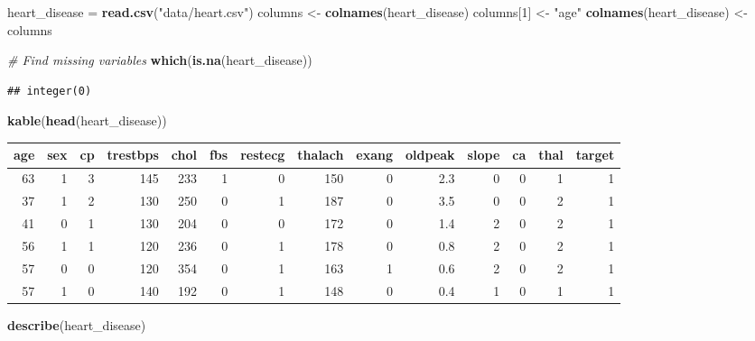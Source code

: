 \documentclass[]{article}
\newenvironment{Shaded}{\begin{snugshade}}{\end{snugshade}}
\newcommand{\KeywordTok}[1]{\textcolor[rgb]{0.13,0.29,0.53}{\textbf{#1}}}
\newcommand{\DecValTok}[1]{\textcolor[rgb]{0.00,0.00,0.81}{#1}}
\newcommand{\StringTok}[1]{\textcolor[rgb]{0.31,0.60,0.02}{#1}}
\newcommand{\CommentTok}[1]{\textcolor[rgb]{0.56,0.35,0.01}{\textit{#1}}}
\newcommand{\NormalTok}[1]{#1}
\begin{document}
\begin{Shaded}
\begin{Highlighting}[]
\NormalTok{heart_disease =}\StringTok{ }\KeywordTok{read.csv}\NormalTok{(}\StringTok{"data/heart.csv"}\NormalTok{)}
\NormalTok{columns <-}\StringTok{ }\KeywordTok{colnames}\NormalTok{(heart_disease)}
\NormalTok{columns[}\DecValTok{1}\NormalTok{] <-}\StringTok{ "age"}
\KeywordTok{colnames}\NormalTok{(heart_disease) <-}\StringTok{ }\NormalTok{columns}

\CommentTok{# Find missing variables}
\KeywordTok{which}\NormalTok{(}\KeywordTok{is.na}\NormalTok{(heart_disease))}
\end{Highlighting}
\end{Shaded}

\begin{verbatim}
## integer(0)
\end{verbatim}

\begin{Shaded}
\begin{Highlighting}[]
\KeywordTok{kable}\NormalTok{(}\KeywordTok{head}\NormalTok{(heart_disease))}
\end{Highlighting}
\end{Shaded}

\begin{longtable}[]{@{}rrrrrrrrrrrrrr@{}}
\toprule
age & sex & cp & trestbps & chol & fbs & restecg & thalach & exang &
oldpeak & slope & ca & thal & target\tabularnewline
\midrule
\endhead
63 & 1 & 3 & 145 & 233 & 1 & 0 & 150 & 0 & 2.3 & 0 & 0 & 1 &
1\tabularnewline
37 & 1 & 2 & 130 & 250 & 0 & 1 & 187 & 0 & 3.5 & 0 & 0 & 2 &
1\tabularnewline
41 & 0 & 1 & 130 & 204 & 0 & 0 & 172 & 0 & 1.4 & 2 & 0 & 2 &
1\tabularnewline
56 & 1 & 1 & 120 & 236 & 0 & 1 & 178 & 0 & 0.8 & 2 & 0 & 2 &
1\tabularnewline
57 & 0 & 0 & 120 & 354 & 0 & 1 & 163 & 1 & 0.6 & 2 & 0 & 2 &
1\tabularnewline
57 & 1 & 0 & 140 & 192 & 0 & 1 & 148 & 0 & 0.4 & 1 & 0 & 1 &
1\tabularnewline
\bottomrule
\end{longtable}

\begin{Shaded}
\begin{Highlighting}[]
\KeywordTok{describe}\NormalTok{(heart_disease)}
\end{Highlighting}
\end{Shaded}
\end{document}
